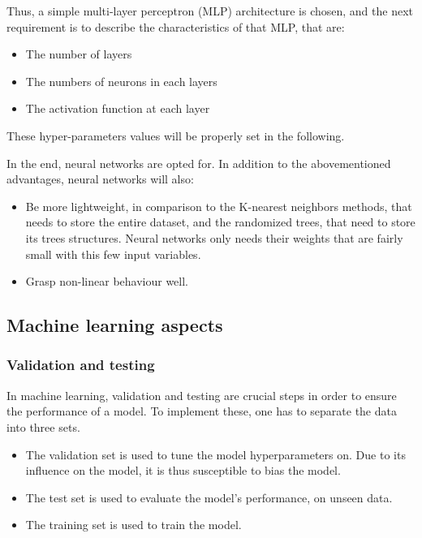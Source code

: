 Thus, a simple multi-layer perceptron (MLP) architecture is chosen, and the next requirement is to describe the characteristics of that MLP, that are:
\begin{itemize}
    \item The number of layers
    \item The numbers of neurons in each layers
    \item The activation function at each layer
\end{itemize}

These hyper-parameters values will be properly set in the following.

In the end, neural networks are opted for. In addition to the abovementioned advantages, neural networks will also:
\begin{itemize}
    \item Be more lightweight, in comparison to the K-nearest neighbors methods, that needs to store the entire dataset, and the randomized trees, that need to store its trees structures. Neural networks only needs their weights that are fairly small with this few input variables.
    \item Grasp non-linear behaviour well.
\end{itemize}

\subsection{Machine learning aspects}

\subsubsection{Validation and testing\label{ssec:val-testing}}

In machine learning, validation and testing are crucial steps in order to ensure the performance of a model. To implement these, one has to separate the data into three sets.

\begin{itemize}
    \item The validation set is used to tune the model hyperparameters on. Due to its influence on the model, it is thus susceptible to bias the model.
    \item The test set is used to evaluate the model's performance, on unseen data.
    \item The training set is used to train the model.
\end{itemize}

